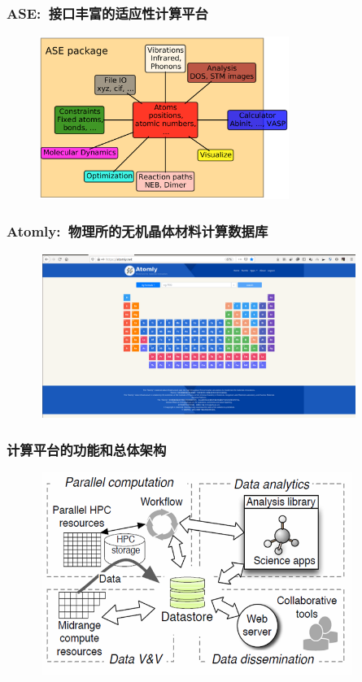 \frame
{
	\frametitle{\textrm{ASE}:~接口丰富的适应性计算平台}
\begin{figure}[h!]
\centering
\vspace*{-0.2in}
\includegraphics[height=2.1in,width=3.2in,viewport=0 0 1208 830,clip]{Figures/ASE_Python_lib.png}
\caption{\fontsize{7.2pt}{4.2pt}}%
\label{Logo_ASE_lib}
\end{figure} 
}

\frame
{
	\frametitle{\textrm{Atomly}:~物理所的无机晶体材料计算数据库}
\begin{figure}[h!]
\centering
\vspace*{-0.2in}
\includegraphics[height=2.1in,width=4.1in,viewport=5 0 1608 830,clip]{Figures/Atomly.png}
\caption{\fontsize{7.2pt}{4.2pt}}%
\label{Logo_Atomly_lib}
\end{figure} 
}

\frame
{
	\frametitle{\textrm{计算平台的功能和总体架构}}
\begin{figure}[h!]
\centering
\vspace*{-0.35in}
\includegraphics[height=2.6in,width=4.05in,viewport=0 0 670 460,clip]{Figures/Parallel_computation.png}
\caption{\fontsize{7.2pt}{4.2pt}}%
\label{Auto_Flow}
\end{figure} 
}


